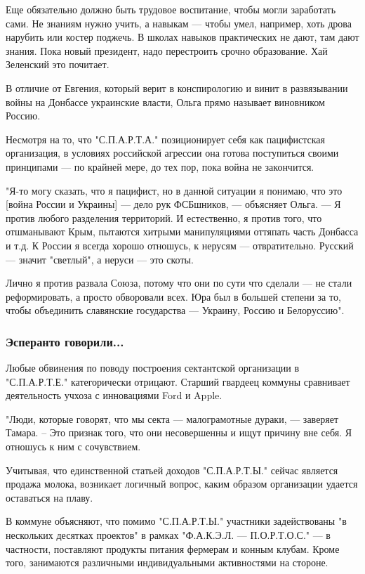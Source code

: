 Еще обязательно должно быть трудовое воспитание, чтобы могли заработать сами.
Не знаниям нужно учить, а навыкам --- чтобы умел, например, хоть дрова нарубить
или костер поджечь. В школах навыков практических не дают, там дают знания.
Пока новый президент, надо перестроить срочно образование. Хай Зеленский это
почитает.

В отличие от Евгения, который верит в конспирологию и винит в развязывании
войны на Донбассе украинские власти, Ольга прямо называет виновником Россию. 

Несмотря на то, что "С.П.А.Р.Т.А." позиционирует себя как пацифистская
организация, в условиях российской агрессии она готова поступиться своими
принципами --- по крайней мере, до тех пор, пока война не закончится.

"Я-то могу сказать, что я пацифист, но в данной ситуации я понимаю, что это
[война России и Украины] --- дело рук ФСБшников, --- объясняет Ольга. --- Я против
любого разделения территорий. И естественно, я против того, что отшманывают
Крым, пытаются хитрыми манипуляциями оттяпать часть Донбасса и т.д. К России я
всегда хорошо отношусь, к нерусям --- отвратительно. Русский --- значит "светлый",
а неруси --- это скоты. 

Лично я против развала Союза, потому что они по сути что сделали --- не стали
реформировать, а просто обворовали всех. Юра был в большей степени за то, чтобы
объединить славянские государства --- Украину, Россию и Белоруссию".

\subsubsection{Эсперанто говорили...}

Любые обвинения по поводу построения сектантской организации в "С.П.А.Р.Т.Е."
категорически отрицают. Старший гвардеец коммуны сравнивает деятельность учхоза
с инновациями Ford и Apple.

"Люди, которые говорят, что мы секта --- малограмотные дураки, --- заверяет Тамара.
– Это признак того, что они несовершенны и ищут причину вне себя. Я отношусь к
ним с сочувствием.

Учитывая, что единственной статьей доходов "С.П.А.Р.Т.Ы." сейчас является
продажа молока, возникает логичный вопрос, каким образом организации удается
оставаться на плаву. 

В коммуне объясняют, что помимо "С.П.А.Р.Т.Ы." участники задействованы "в
нескольких десятках проектов" в рамках "Ф.А.К.Э.Л. --- П.О.Р.Т.О.С." --- в
частности, поставляют продукты питания фермерам и конным клубам. Кроме того,
занимаются различными индивидуальными активностями на стороне.

